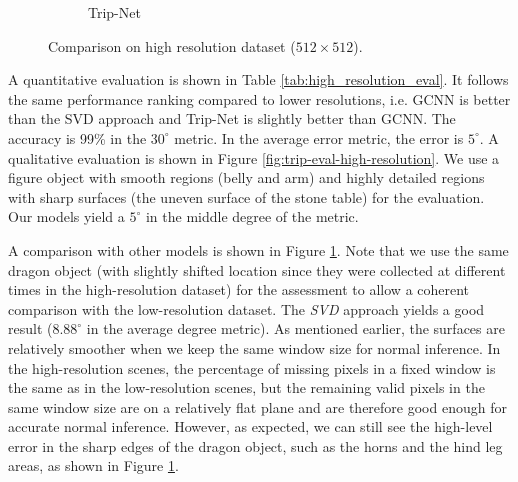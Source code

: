 \begin{figure}[H]
\begin{subfigure}[b]{0.24\linewidth}
		\caption{Trip-Net}
	\end{subfigure}
	\decoRule
	\caption{Comparison on high resolution dataset ($ 512\times 512 $).}
	\label{fig:trip-eval-compare}
\end{figure}



A quantitative evaluation is shown in Table \ref{tab:high_resolution_eval}. It follows the same performance ranking compared to lower resolutions, i.e. GCNN is better than the SVD approach and Trip-Net is slightly better than GCNN. The accuracy is 99\% in the $30^\circ $ metric. In the average error metric, the error is $ 5^\circ $.  A qualitative evaluation is shown in Figure \ref{fig:trip-eval-high-resolution}. We use a figure object with smooth regions (belly and arm) and highly detailed regions with sharp surfaces (the uneven surface of the stone table) for the evaluation. Our models yield a $ 5^\circ $ in the middle degree of the metric. 

A comparison with other models is shown in Figure \ref{fig:trip-eval-compare}. Note that we use the same dragon object (with slightly shifted location since they were collected at different times in the high-resolution dataset) for the assessment to allow a coherent comparison with the low-resolution dataset. The \textit{SVD} approach yields a good result ($8.88^\circ $ in the average degree metric). As mentioned earlier, the surfaces are relatively smoother when we keep the same window size for normal inference. In the high-resolution scenes, the percentage of missing pixels in a fixed window is the same as in the low-resolution scenes, but the remaining valid pixels in the same window size are on a relatively flat plane and are therefore good enough for accurate normal inference. However, as expected, we can still see the high-level error in the sharp edges of the dragon object, such as the horns and the hind leg areas, as shown in Figure \ref{fig:trip-eval-compare}.




